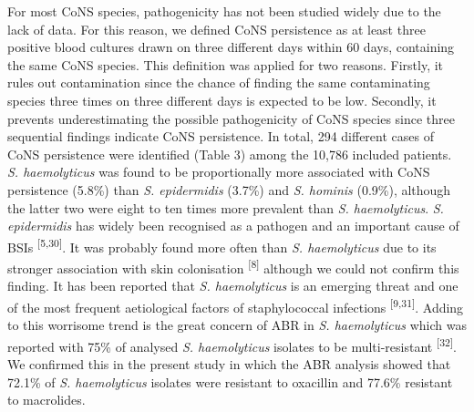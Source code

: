 \documentclass[
]{book}
\begin{document}
For most CoNS species, pathogenicity has not been studied widely due to the lack of data. For this reason, we defined CoNS persistence as at least three positive blood cultures drawn on three different days within 60 days, containing the same CoNS species. This definition was applied for two reasons. Firstly, it rules out contamination since the chance of finding the same contaminating species three times on three different days is expected to be low. Secondly, it prevents underestimating the possible pathogenicity of CoNS species since three sequential findings indicate CoNS persistence. In total, 294 different cases of CoNS persistence were identified (Table 3) among the 10,786 included patients. \emph{S. haemolyticus} was found to be proportionally more associated with CoNS persistence (5.8\%) than \emph{S. epidermidis} (3.7\%) and \emph{S. hominis} (0.9\%), although the latter two were eight to ten times more prevalent than \emph{S. haemolyticus}. \emph{S. epidermidis} has widely been recognised as a pathogen and an important cause of BSIs \textsuperscript{{[}5,30{]}}. It was probably found more often than \emph{S. haemolyticus} due to its stronger association with skin colonisation \textsuperscript{{[}8{]}} although we could not confirm this finding. It has been reported that \emph{S. haemolyticus} is an emerging threat and one of the most frequent aetiological factors of staphylococcal infections \textsuperscript{{[}9,31{]}}. Adding to this worrisome trend is the great concern of ABR in \emph{S. haemolyticus} which was reported with 75\% of analysed \emph{S. haemolyticus} isolates to be multi-resistant \textsuperscript{{[}32{]}}. We confirmed this in the present study in which the ABR analysis showed that 72.1\% of \emph{S. haemolyticus} isolates were resistant to oxacillin and 77.6\% resistant to macrolides.
\end{document}
